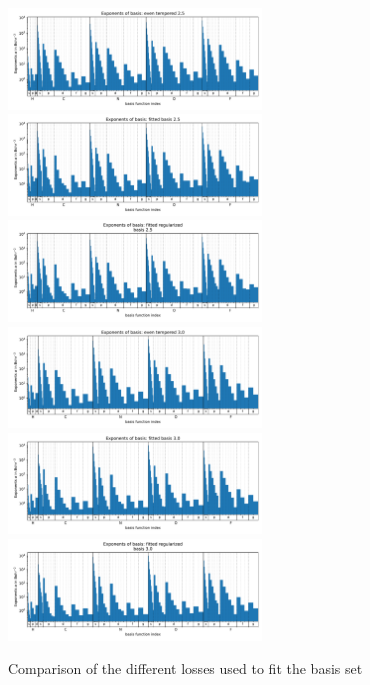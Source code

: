 \begin{figure}
    \centering
    \includegraphics[width=0.6\textwidth]{chapters/results/results_images/basis_functions_even_tempered_2.5}
    \includegraphics[width=0.6\textwidth]{chapters/results/results_images/basis_functions_fitted_basis_2.5}
    \includegraphics[width=0.6\textwidth]{chapters/results/results_images/basis_functions_fitted_regularized_basis_2.5}
    \includegraphics[width=0.6\textwidth]{chapters/results/results_images/basis_functions_even_tempered_3.0}
    \includegraphics[width=0.6\textwidth]{chapters/results/results_images/basis_functions_fitted_basis_3.0}
    \includegraphics[width=0.6\textwidth]{chapters/results/results_images/basis_functions_fitted_regularized_basis_3.0}
    \caption{Comparison of the different losses used to fit the basis set}
\end{figure}

